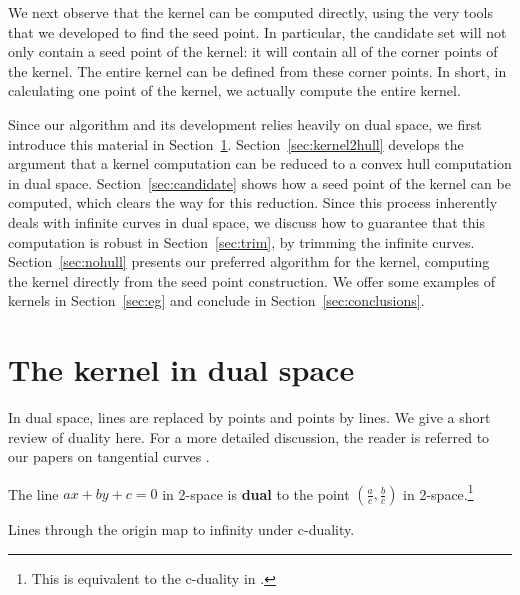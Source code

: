 \documentclass[12pt]{article}
\begin{document}
We next observe that 
the kernel can be computed directly,
using the very tools that we developed to find the seed point.
In particular, the candidate set will not only contain a seed point of
the kernel: it will contain all of the corner points of the kernel.
The entire kernel can be defined from these corner points.
In short, in calculating one point of the kernel, we actually compute
the entire kernel.

Since our algorithm and its development relies heavily on dual space,
we first introduce this material in Section~\ref{sec:duality}.
Section~\ref{sec:kernel2hull} develops the argument that a kernel computation
can be reduced to a convex hull computation in dual space.
Section~\ref{sec:candidate} shows how a seed point of the kernel can be computed,
which clears the way for this reduction.
Since this process inherently deals with infinite curves in dual space,
we discuss how to guarantee that this computation is robust 
in Section~\ref{sec:trim}, by trimming the infinite curves.
Section~\ref{sec:nohull} presents our preferred algorithm for the kernel,
computing the kernel directly from the seed point construction.
We offer some examples of kernels in Section~\ref{sec:eg} and conclude 
in Section~\ref{sec:conclusions}.


\section{The kernel in dual space}
\label{sec:duality}

In dual space, lines are replaced by points and points by lines.
We give a short review of duality here.
For a more detailed discussion, the reader is referred to our papers
on tangential curves \cite{jj01,jj02}.

\begin{defn2}
\label{defn:dual}
The line $ax+by+c=0$ in 2-space is {\bf dual} to the point 
$(\frac{a}{c}, \frac{b}{c})$ in 2-space.\footnote{This is equivalent to 
	the c-duality in \cite{jj02}.}
\end{defn2}

\begin{lemma}
\label{lem:cinfty}
Lines through the origin map to infinity under c-duality.
\end{lemma}
\end{document}
